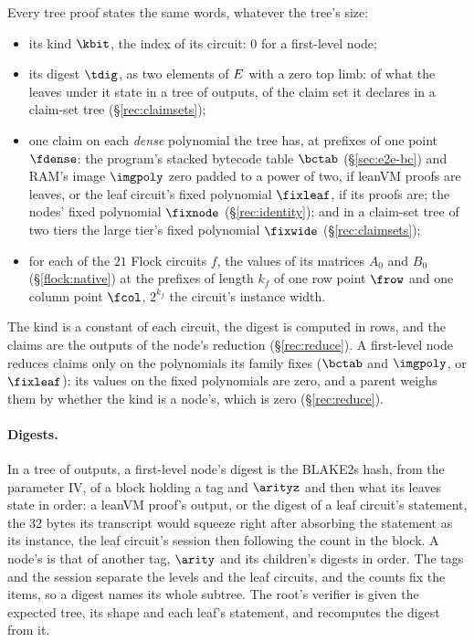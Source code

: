 Every tree proof states the same words, whatever the tree's size:
\begin{itemize}[itemsep=1pt,topsep=3pt]
\item its kind $\kbit$, the index of its circuit: $0$ for a first-level node;
\item its digest $\tdig$, as two elements of $E$ with a zero top limb: of what the leaves under it state in a tree of outputs, of the claim set it declares in a claim-set tree (\S\ref{rec:claimsets});
\item one claim on each \emph{dense} polynomial the tree has, at prefixes of one point $\fdense$: the program's stacked bytecode table $\bctab$ (\S\ref{sec:e2e-bc}) and RAM's image $\imgpoly$ zero padded to a power of two, if leanVM proofs are leaves, or the leaf circuit's fixed polynomial $\fixleaf$, if its proofs are; the nodes' fixed polynomial $\fixnode$ (\S\ref{rec:identity}); and in a claim-set tree of two tiers the large tier's fixed polynomial $\fixwide$ (\S\ref{rec:claimsets});
\item for each of the $21$ Flock circuits $f$, the values of its matrices $A_0$ and $B_0$ (\S\ref{flock:native}) at the prefixes of length $k_f$ of one row point $\frow$ and one column point $\fcol$, $2^{k_f}$ the circuit's instance width.
\end{itemize}
The kind is a constant of each circuit, the digest is computed in rows, and the claims are the outputs of the node's reduction (\S\ref{rec:reduce}). A first-level node reduces claims only on the polynomials its family fixes ($\bctab$ and $\imgpoly$, or $\fixleaf$): its values on the fixed polynomials are zero, and a parent weighs them by whether the kind is a node's, which is zero (\S\ref{rec:reduce}).

\paragraph{Digests.} In a tree of outputs, a first-level node's digest is the BLAKE2s hash, from the parameter IV, of a block holding a tag and $\arityz$ and then what its leaves state in order: a leanVM proof's output, or the digest of a leaf circuit's statement, the 32 bytes its transcript would squeeze right after absorbing the statement as its instance, the leaf circuit's session then following the count in the block. A node's is that of another tag, $\arity$ and its children's digests in order. The tags and the session separate the levels and the leaf circuits, and the counts fix the items, so a digest names its whole subtree. The root's verifier is given the expected tree, its shape and each leaf's statement, and recomputes the digest from it.

